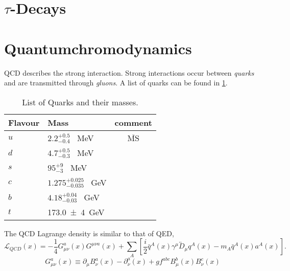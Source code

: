 \documentclass[../../index.tex]{subfiles}
\begin{document}
\section{$\tau$-Decays}
\label{sec:tauDecays}


\section{Quantumchromodynamics}
\label{sec:quantumchromodynamics}
QCD describes the strong interaction. Strong interactions
occur between \textit{quarks} and are transmitted through \textit{gluons}. A
list of quarks can be found in \ref{table:quarkList}.
\begin{table}
  \label{table:quarkList}
  \centering
  \begin{tabular}{l l c}
    \toprule
    Flavour & Mass & comment\\
    \midrule
    $u$ & $2.2_{-0.4}^{+0.5}$ \SI{}{\mega\eV} & $\overline{\text{MS}}$ \\
    $d$ & $4.7_{-0.3}^{+0.5}$ \SI{}{\mega\eV} \\
    $s$ & $95_{-3}^{+9}$ \SI{}{\mega\eV}  \\
    $c$ & $1.275_{-0.035}^{+0.025}$ \SI{}{\giga\eV} \\
    $b$ & $4.18_{-0.03}^{+0.04}$ \SI{}{\giga\eV} \\
    $t$ & \SI{173.0 \pm 4}{\giga\eV} \\
    \bottomrule 
  \end{tabular}
  \caption{List of Quarks and their masses\cite{PDG2018}.}
\end{table}

The QCD Lagrange density is similar to that of QED\cite{Jamin2006},
\begin{equation}
  \label{eq:qcdLagrangian}
  \mathcal{L}_{QCD}(x) = -\frac{1}{4}G_{\mu\nu}^a(x)G^{\mu\nu a}(x) + \sum_A \left[ \frac{i}{2} \bar{q}^A(x) \gamma^\mu \overleftrightarrow{D}_\mu q^A(x) - m_A\bar{q}^A(x) a^A(x) \right].
\end{equation}
\begin{equation}
  \label{eq:gluonField}
  G_{\mu\nu}^a(x) \equiv \partial_\mu B_\nu^a(x) - \partial_\nu^a(x) + g f^{abc} B_\mu^b(x) B_\nu^c(x)
\end{equation}
\end{document}
